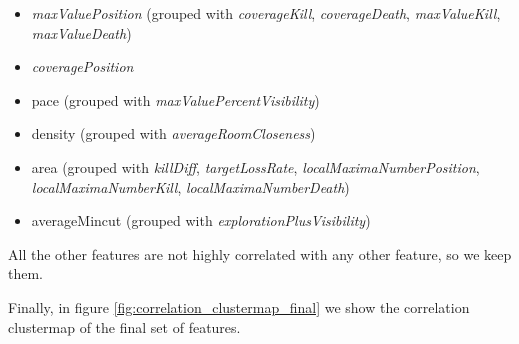 \documentclass{Configuration_Files/PoliMi3i_thesis}
\begin{document}
\begin{itemize}
    \item \textit{maxValuePosition} (grouped with \textit{coverageKill}, \textit{coverageDeath}, \textit{maxValueKill}, \textit{maxValueDeath})
    \item \textit{coveragePosition}
    \item pace (grouped with \textit{maxValuePercentVisibility})
    \item density (grouped with \textit{averageRoomCloseness})
    \item area (grouped with \textit{killDiff}, \textit{targetLossRate}, \textit{localMaximaNumberPosition}, \textit{localMaximaNumberKill}, \textit{localMaximaNumberDeath})
    \item averageMincut (grouped with \textit{explorationPlusVisibility})
\end{itemize}
All the other features are not highly correlated with any other feature, so we keep them.

Finally, in figure \ref{fig:correlation_clustermap_final} we show the correlation clustermap of the final set of features.
\end{document}
